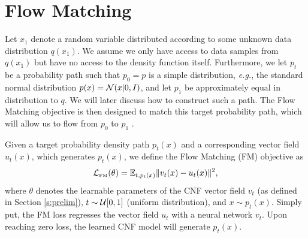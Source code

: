 \documentclass{article}
\makeatletter
\renewcommand*{\eg}{{\it e.g.}\@\xspace}
\makeatother
\begin{document}
\section{Flow Matching}\label{sec:flow_matching}
%
Let $x_1$ denote a random variable distributed according to some unknown data distribution $q(x_1)$.
We assume we only have access to data samples from $q(x_1)$ but have no access to the density function itself.
Furthermore, we let $p_t$ be a probability path such that $p_0=p$ is a simple distribution, \eg, the standard normal distribution $p(x) = {\mathcal{N}}(x | 0, I)$, and let $p_1$ be approximately equal in distribution to $q$. We will later discuss how to construct such a path.
%
The Flow Matching objective is then designed to match this target probability path, which will allow us to flow from $p_0$ to $p_1$%
.



Given a target probability density path $p_t(x)$ and a corresponding vector field $u_t(x)$, which generates $p_t(x)$, we define the Flow Matching (FM) objective as 
\begin{equation}\label{e:fm}
    \mathcal{L}_{\scriptscriptstyle \text{FM} }(\theta) = \mathbb{E}_{t,p_t(x)}\| v_t(x)-u_t(x) \|^2,
\end{equation}
where $\theta$ denotes the learnable parameters of the CNF vector field $v_t$ (as defined in Section \ref{s:prelim}), $t\sim {\mathcal{U}}[0,1]$ (uniform distribution), and $x\sim p_t(x)$. Simply put, the FM loss regresses the vector field $u_t$ with a neural network $v_t$. Upon reaching zero loss, the learned CNF model will generate $p_t(x)$.
\end{document}
